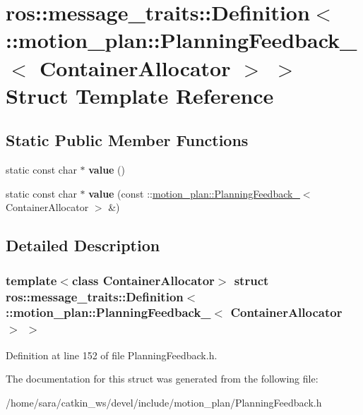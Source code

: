 \hypertarget{structros_1_1message__traits_1_1Definition_3_01_1_1motion__plan_1_1PlanningFeedback___3_01ContainerAllocator_01_4_01_4}{}\section{ros\+:\+:message\+\_\+traits\+:\+:Definition$<$ \+:\+:motion\+\_\+plan\+:\+:Planning\+Feedback\+\_\+$<$ Container\+Allocator $>$ $>$ Struct Template Reference}
\label{structros_1_1message__traits_1_1Definition_3_01_1_1motion__plan_1_1PlanningFeedback___3_01ContainerAllocator_01_4_01_4}
\subsection*{Static Public Member Functions}
\begin{DoxyCompactItemize}
\item 
\mbox{\label{structros_1_1message__traits_1_1Definition_3_01_1_1motion__plan_1_1PlanningFeedback___3_01ContainerAllocator_01_4_01_4_a76e27ecd977323ecc3bf7a15d8ffac0e}} 
static const char $\ast$ {\bfseries value} ()
\item 
\mbox{\label{structros_1_1message__traits_1_1Definition_3_01_1_1motion__plan_1_1PlanningFeedback___3_01ContainerAllocator_01_4_01_4_a024629f7bb91b1271b889263c5e73045}} 
static const char $\ast$ {\bfseries value} (const \+::\hyperlink{structmotion__plan_1_1PlanningFeedback__}{motion\+\_\+plan\+::\+Planning\+Feedback\+\_\+}$<$ Container\+Allocator $>$ \&)
\end{DoxyCompactItemize}


\subsection{Detailed Description}
\subsubsection*{template$<$class Container\+Allocator$>$\newline
struct ros\+::message\+\_\+traits\+::\+Definition$<$ \+::motion\+\_\+plan\+::\+Planning\+Feedback\+\_\+$<$ Container\+Allocator $>$ $>$}



Definition at line 152 of file Planning\+Feedback.\+h.



The documentation for this struct was generated from the following file\+:\begin{DoxyCompactItemize}
\item 
/home/sara/catkin\+\_\+ws/devel/include/motion\+\_\+plan/Planning\+Feedback.\+h\end{DoxyCompactItemize}
